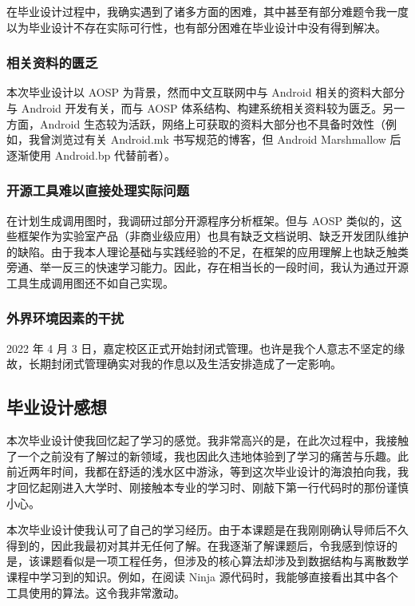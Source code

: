 在毕业设计过程中，我确实遇到了诸多方面的困难，其中甚至有部分难题令我一度以为毕业设计不存在实际可行性，也有部分困难在毕业设计中没有得到解决。

\subsubsection{相关资料的匮乏}

本次毕业设计以 AOSP 为背景，然而中文互联网中与 Android 相关的资料大部分与 Android 开发有关，而与 AOSP 体系结构、构建系统相关资料较为匮乏。另一方面，Android 生态较为活跃，网络上可获取的资料大部分也不具备时效性（例如，我曾浏览过有关 Android.mk 书写规范的博客，但 Android Marshmallow 后逐渐使用 Android.bp 代替前者）。

\subsubsection{开源工具难以直接处理实际问题}

在计划生成调用图时，我调研过部分开源程序分析框架。但与 AOSP 类似的，这些框架作为实验室产品（非商业级应用）也具有缺乏文档说明、缺乏开发团队维护的缺陷。由于我本人理论基础与实践经验的不足，在框架的应用理解上也缺乏触类旁通、举一反三的快速学习能力。因此，存在相当长的一段时间，我认为通过开源工具生成调用图还不如自己实现。

\subsubsection{外界环境因素的干扰}

2022 年 4 月 3 日，嘉定校区正式开始封闭式管理。也许是我个人意志不坚定的缘故，长期封闭式管理确实对我的作息以及生活安排造成了一定影响。

\subsection{毕业设计感想}

本次毕业设计使我回忆起了学习的感觉。我非常高兴的是，在此次过程中，我接触了一个之前没有了解过的新领域，我也因此久违地体验到了学习的痛苦与乐趣。此前近两年时间，我都在舒适的浅水区中游泳，等到这次毕业设计的海浪拍向我，我才回忆起刚进入大学时、刚接触本专业的学习时、刚敲下第一行代码时的那份谨慎小心。

本次毕业设计使我认可了自己的学习经历。由于本课题是在我刚刚确认导师后不久得到的，因此我最初对其并无任何了解。在我逐渐了解课题后，令我感到惊讶的是，该课题看似是一项工程任务，但涉及的核心算法却涉及到数据结构与离散数学课程中学习到的知识。例如，在阅读 Ninja 源代码时，我能够直接看出其中各个工具使用的算法。这令我非常激动。

